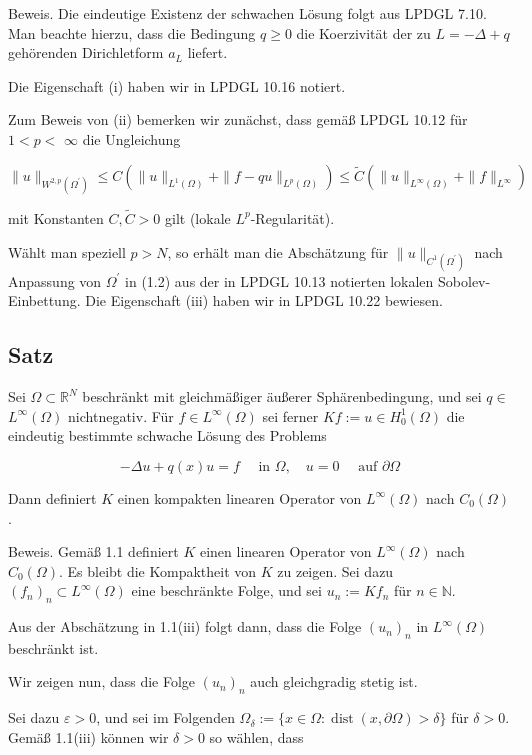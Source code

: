 \documentclass[10pt, letterpaper]{article}
\begin{document}
Beweis. Die eindeutige Existenz der schwachen Lösung folgt aus LPDGL 7.10. Man beachte hierzu, dass die Bedingung $q \geq 0$ die Koerzivität der zu $L=-\Delta+q$ gehörenden Dirichletform $a_{L}$ liefert.

Die Eigenschaft (i) haben wir in LPDGL 10.16 notiert.

Zum Beweis von (ii) bemerken wir zunächst, dass gemäß LPDGL 10.12 für $1<p<$ $\infty$ die Ungleichung

$$
\|u\|_{W^{2, p}\left(\Omega^{\prime}\right)} \leq C\left(\|u\|_{L^{1}(\Omega)}+\|f-q u\|_{L^{p}(\Omega)}\right) \leq \tilde{C}\left(\|u\|_{L^{\infty}(\Omega)}+\|f\|_{L^{\infty}}\right)
$$

mit Konstanten $C, \tilde{C}>0$ gilt (lokale $L^{p}$-Regularität).

Wählt man speziell $p>N$, so erhält man die Abschätzung für $\|u\|_{C^{1}\left(\Omega^{\prime}\right)}$ nach Anpassung von $\Omega^{\prime}$ in (1.2) aus der in LPDGL 10.13 notierten lokalen Sobolev-Einbettung. Die Eigenschaft (iii) haben wir in LPDGL 10.22 bewiesen.


\subsection*{Satz}

Sei $\Omega \subset \mathbb{R}^{N}$ beschränkt mit gleichmäßiger äußerer Sphärenbedingung, und sei $q \in$ $L^{\infty}(\Omega)$ nichtnegativ. Für $f \in L^{\infty}(\Omega)$ sei ferner $K f:=u \in H_{0}^{1}(\Omega)$ die eindeutig bestimmte schwache Lösung des Problems

$$
-\Delta u+q(x) u=f \quad \text { in } \Omega, \quad u=0 \quad \text { auf } \partial \Omega
$$

Dann definiert $K$ einen kompakten linearen Operator von $L^{\infty}(\Omega)$ nach $C_{0}(\Omega)$.

    
Beweis. Gemäß 1.1 definiert $K$ einen linearen Operator von $L^{\infty}(\Omega)$ nach $C_{0}(\Omega)$. Es bleibt die Kompaktheit von $K$ zu zeigen. Sei dazu $\left(f_{n}\right)_{n} \subset L^{\infty}(\Omega)$ eine beschränkte Folge, und sei $u_{n}:=K f_{n}$ für $n \in \mathbb{N}$.

Aus der Abschätzung in 1.1(iii) folgt dann, dass die Folge $\left(u_{n}\right)_{n}$ in $L^{\infty}(\Omega)$ beschränkt ist.

Wir zeigen nun, dass die Folge $\left(u_{n}\right)_{n}$ auch gleichgradig stetig ist.

Sei dazu $\varepsilon>0$, und sei im Folgenden $\Omega_{\delta}:=\{x \in \Omega: \operatorname{dist}(x, \partial \Omega)>\delta\}$ für $\delta>0$. Gemäß 1.1(iii) können wir $\delta>0$ so wählen, dass
\end{document}
